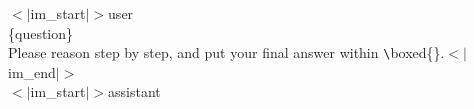 \begin{prompt}[title={Training and Evaluation Prompt Template for Math Reasoning}]
\label{prompt: qwen3 math}
$<|$im\_start$|>$user
\\
\{question\}
\\
Please reason step by step, and put your final answer within  \verb|\|boxed\{\}.$<|$im\_end$|>$
\\
$<|$im\_start$|>$assistant
\end{prompt}
